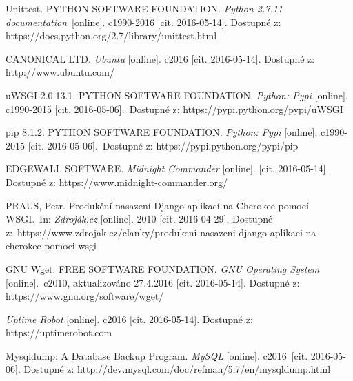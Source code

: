\begin{thebibliography}{1}
Unittest. PYTHON SOFTWARE FOUNDATION. \textit{Python 2.7.11 documentation}\
[online]. c1990-2016 [cit. 2016-05-14]. Dostupné z: https://docs.python.org/2.7/library/unittest.html

CANONICAL LTD. \textit{Ubuntu} [online]. c2016 [cit. 2016-05-14]. Dostupné z: http://www.ubuntu.com/

uWSGI 2.0.13.1. PYTHON SOFTWARE FOUNDATION. \textit{Python: Pypi} [online]. c1990-2015 [cit. 2016-05-06].\
Dostupné z: https://pypi.python.org/pypi/uWSGI

pip 8.1.2. PYTHON SOFTWARE FOUNDATION. \textit{Python: Pypi} [online]. c1990-2015 [cit. 2016-05-06].\
Dostupné z: https://pypi.python.org/pypi/pip

\bibitem{mc}
EDGEWALL SOFTWARE. \textit{Midnight Commander} [online]. [cit. 2016-05-14]. Dostupné z: https://www.midnight-commander.org/

PRAUS, Petr. Produkční nasazení Django aplikací na Cherokee pomocí WSGI.\
In: \textit{Zdroják.cz} [online]. 2010 [cit. 2016-04-29]. Dostupné z:\
https://www.zdrojak.cz/clanky/produkcni-nasazeni-django-aplikaci-na-cherokee-pomoci-wsgi

\bibitem{wget}
GNU Wget. FREE SOFTWARE FOUNDATION. \textit{GNU Operating System} [online].\
c2010, aktualizováno 27.4.2016 [cit. 2016-05-14]. Dostupné z: https://www.gnu.org/software/wget/

\bibitem{uptime_robot}
\textit{Uptime Robot} [online]. c2016 [cit. 2016-05-14]. Dostupné z: https://uptimerobot.com

\bibitem{mysqldump}
Mysqldump: A Database Backup Program. \textit{MySQL} [online]. c2016\
[cit. 2016-05-06]. Dostupné z: http://dev.mysql.com/doc/refman/5.7/en/mysqldump.html


\end{thebibliography}